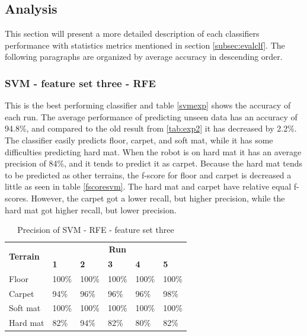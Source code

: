 \documentclass[USenglish]{ifimaster}  %
\begin{document}
\subsection{Analysis}
This section will present a more detailed description of each classifiers performance with statistics metrics mentioned in section \ref{subsec:evalclf}. The following paragraphs are organized by average accuracy in descending order.
\newpage

\subsubsection{SVM - feature set three - RFE} \label{sb:svmwrapper}
This is the best performing classifier and table \ref{svmexp} shows the accuracy of each run. The average performance of predicting unseen data has an accuracy of 94.8\%, and compared to the old result from \ref{tab:exp2} it has decreased by 2.2\%. The classifier easily predicts floor, carpet, and soft mat, while it has some difficulties predicting hard mat. When the robot is on hard mat it has an average precision of 84\%, and it tends to predict it as carpet. Because the hard mat tends to be predicted as other terrains, the f-score for floor and carpet is decreased a little as seen in table \ref{fscoresvm}. The hard mat and carpet have relative equal f-scores. However, the carpet got a lower recall, but higher precision, while the hard mat got higher recall, but lower precision.

\begin{table}[h]
	\begin{subtable}[h]{1\textwidth}
		\centering
		\captionsetup{justification=centering}
		\begin{tabular}{@{}llllll@{}}
			\toprule
			\multirow{2}{*}{\textbf{Terrain}} & \multicolumn{5}{c}{\textbf{Run}} \\ \cmidrule(l){2-6} 
			& \multicolumn{1}{l|}{\textbf{1}} & \multicolumn{1}{l|}{\textbf{2}} & \multicolumn{1}{l|}{\textbf{3}} & \multicolumn{1}{l|}{\textbf{4}} & \textbf{5} \\ \midrule
			\multicolumn{1}{l|}{Floor} & \multicolumn{1}{l|}{100\%} & \multicolumn{1}{l|}{100\%} & \multicolumn{1}{l|}{100\%} & \multicolumn{1}{l|}{100\%} & 100\% \\ \midrule
			\multicolumn{1}{l|}{Carpet} & \multicolumn{1}{l|}{94\%} & \multicolumn{1}{l|}{96\%} & \multicolumn{1}{l|}{96\%} & \multicolumn{1}{l|}{96\%} & 98\% \\ \midrule
			\multicolumn{1}{l|}{Soft mat} & \multicolumn{1}{l|}{100\%} & \multicolumn{1}{l|}{100\%} & \multicolumn{1}{l|}{100\%} & \multicolumn{1}{l|}{100\%} & 100\% \\ \midrule
			\multicolumn{1}{l|}{Hard mat} & \multicolumn{1}{l|}{82\%} & \multicolumn{1}{l|}{94\%} & \multicolumn{1}{l|}{82\%} & \multicolumn{1}{l|}{80\%} & 82\% \\ \bottomrule
		\end{tabular}
		\caption{Precision of SVM - RFE - feature set three}
		\label{pressvm}
	\end{subtable}
\end{table}
\end{document}
